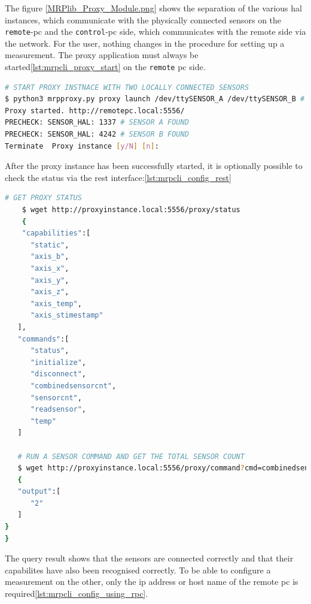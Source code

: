 The figure \ref{MRPlib_Proxy_Module.png} shows the separation of the
various \gls{hal} instances, which communicate with the physically
connected sensors on the \passthrough{\lstinline!remote!}-\gls{pc} and
the \passthrough{\lstinline!control!}-\gls{pc} side, which communicates
with the remote side via the network. For the user, nothing changes in
the procedure for setting up a measurement. The proxy application must
always be started\ref{lst:mrpcli_proxy_start} on the
\passthrough{\lstinline!remote!} \gls{pc} side.

\begin{lstlisting}[language=bash, caption={MRPproxy usage to enable local sensor usage over network}, label=lst:mrpcli_proxy_start]
# START PROXY INSTNACE WITH TWO LOCALLY CONNECTED SENSORS
$ python3 mrpproxy.py proxy launch /dev/ttySENSOR_A /dev/ttySENSOR_B # add another proxy instance http://proxyinstance_2.local for multi-sensor, multi-proxy chain
Proxy started. http://remotepc.local:5556/
PRECHECK: SENSOR_HAL: 1337 # SENSOR A FOUND
PRECHECK: SENSOR_HAL: 4242 # SENSOR B FOUND
Terminate  Proxy instance [y/N] [n]: 
\end{lstlisting}

After the proxy instance has been successfully started, it is optionally
possible to check the status via the \gls{rest}
interface:\ref{lst:mrpcli_config_rest}

\begin{lstlisting}[language=bash, caption={MRPproxy REST enpoiint query examples}, label=lst:mrpcli_config_rest]
    # GET PROXY STATUS
    $ wget http://proxyinstance.local:5556/proxy/status
    {
    "capabilities":[
      "static",
      "axis_b",
      "axis_x",
      "axis_y",
      "axis_z",
      "axis_temp",
      "axis_stimestamp"
   ],
   "commands":[
      "status",
      "initialize",
      "disconnect",
      "combinedsensorcnt",
      "sensorcnt",
      "readsensor",
      "temp"
   ]

   # RUN A SENSOR COMMAND AND GET THE TOTAL SENSOR COUNT
   $ wget http://proxyinstance.local:5556/proxy/command?cmd=combinedsensorcnt
   {
   "output":[
      "2"
   ]
}
}
\end{lstlisting}

The query result shows that the sensors are connected correctly and that
their capabilites have also been recognised correctly. To be able to
configure a measurement on the other, only the \gls{ip} address or host
name of the remote \gls{pc} is
required\ref{lst:mrpcli_config_using_rpc}.

